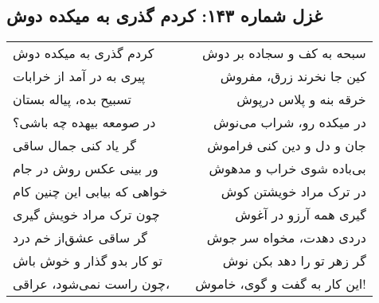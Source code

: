 \begin{center}
\section*{غزل شماره ۱۴۳: کردم گذری به میکده دوش}
\label{sec:143}
\begin{longtable}{l p{0.5cm} r}
کردم گذری به میکده دوش
&&
سبحه به کف و سجاده بر دوش
\\
پیری به در آمد از خرابات
&&
کین جا نخرند زرق، مفروش
\\
تسبیح بده، پیاله بستان
&&
خرقه بنه و پلاس درپوش
\\
در صومعه بیهده چه باشی؟
&&
در میکده رو، شراب می‌نوش
\\
گر یاد کنی جمال ساقی
&&
جان و دل و دین کنی فراموش
\\
ور بینی عکس روش در جام
&&
بی‌باده شوی خراب و مدهوش
\\
خواهی که بیابی این چنین کام
&&
در ترک مراد خویشتن کوش
\\
چون ترک مراد خویش گیری
&&
گیری همه آرزو در آغوش
\\
گر ساقی عشق‌از خم درد
&&
دردی دهدت، مخواه سر جوش
\\
تو کار بدو گذار و خوش باش
&&
گر زهر تو را دهد بکن نوش
\\
چون راست نمی‌شود، عراقی،
&&
این کار به گفت و گوی، خاموش!
\\
\end{longtable}
\end{center}
